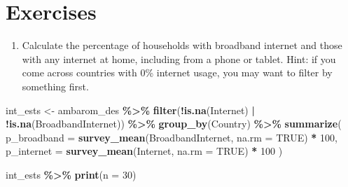 \documentclass[
]{krantz}
\makeatletter
\newenvironment{Shaded}{\begin{snugshade}}{\end{snugshade}}
\newcommand{\AttributeTok}[1]{\textcolor[rgb]{0.27,0.27,0.27}{#1}}
\newcommand{\ConstantTok}[1]{\textcolor[rgb]{0.37,0.37,0.37}{#1}}
\newcommand{\DecValTok}[1]{\textcolor[rgb]{0.06,0.06,0.06}{#1}}
\newcommand{\FunctionTok}[1]{\textcolor[rgb]{0.27,0.27,0.27}{\textbf{#1}}}
\newcommand{\NormalTok}[1]{#1}
\newcommand{\OtherTok}[1]{\textcolor[rgb]{0.37,0.37,0.37}{#1}}
\newcommand{\SpecialCharTok}[1]{\textcolor[rgb]{0.43,0.43,0.43}{\textbf{#1}}}
\providecommand{\tightlist}{%
  \setlength{\itemsep}{0pt}\setlength{\parskip}{0pt}}
\newenvironment{kframe}{%
\medskip{}
\setlength{\fboxsep}{.8em}
 \def\at@end@of@kframe{}%
 \ifinner\ifhmode%
  \def\at@end@of@kframe{\end{minipage}}%
  \begin{minipage}{\columnwidth}%
 \fi\fi%
 \def\FrameCommand##1{\hskip\@totalleftmargin \hskip-\fboxsep
 \colorbox{shadecolor}{##1}\hskip-\fboxsep
     \hskip-\linewidth \hskip-\@totalleftmargin \hskip\columnwidth}%
 \MakeFramed {\advance\hsize-\width
   \@totalleftmargin\z@ \linewidth\hsize
   \@setminipage}}%
 {\par\unskip\endMakeFramed%
 \at@end@of@kframe}
\renewenvironment{Shaded}{\begin{kframe}}{\end{kframe}}
\makeatother
\begin{document}
\hypertarget{exercises-4}{%
\section{Exercises}\label{exercises-4}}

\begin{enumerate}
\def\labelenumi{\arabic{enumi}.}
\tightlist
\item
  Calculate the percentage of households with broadband internet and those with any internet at home, including from a phone or tablet. Hint: if you come across countries with 0\% internet usage, you may want to filter by something first.
\end{enumerate}

\begin{Shaded}
\begin{Highlighting}[]
\NormalTok{int\_ests }\OtherTok{\textless{}{-}}
\NormalTok{  ambarom\_des }\SpecialCharTok{\%\textgreater{}\%}
  \FunctionTok{filter}\NormalTok{(}\SpecialCharTok{!}\FunctionTok{is.na}\NormalTok{(Internet) }\SpecialCharTok{|} \SpecialCharTok{!}\FunctionTok{is.na}\NormalTok{(BroadbandInternet)) }\SpecialCharTok{\%\textgreater{}\%}
  \FunctionTok{group\_by}\NormalTok{(Country) }\SpecialCharTok{\%\textgreater{}\%}
  \FunctionTok{summarize}\NormalTok{(}
    \AttributeTok{p\_broadband =} \FunctionTok{survey\_mean}\NormalTok{(BroadbandInternet, }\AttributeTok{na.rm =} \ConstantTok{TRUE}\NormalTok{) }\SpecialCharTok{*} \DecValTok{100}\NormalTok{,}
    \AttributeTok{p\_internet =} \FunctionTok{survey\_mean}\NormalTok{(Internet, }\AttributeTok{na.rm =} \ConstantTok{TRUE}\NormalTok{) }\SpecialCharTok{*} \DecValTok{100}
\NormalTok{  )}

\NormalTok{int\_ests }\SpecialCharTok{\%\textgreater{}\%}
  \FunctionTok{print}\NormalTok{(}\AttributeTok{n =} \DecValTok{30}\NormalTok{)}
\end{Highlighting}
\end{Shaded}
\end{document}
